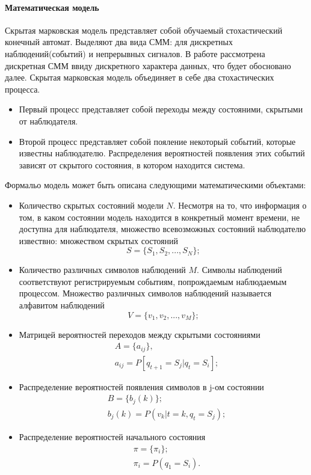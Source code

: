 \paragraph{Математическая модель}
Скрытая марковская модель представляет собой обучаемый стохастический конечный автомат. Выделяют два вида СММ: для дискретных наблюдений(событий) и непрерывных сигналов. В работе рассмотрена дискретная СММ ввиду дискретного характера данных, что будет обосновано далее. Скрытая марковская модель объединяет в себе два стохастических процесса.
\begin{itemize}
\item
Первый процесс представляет собой переходы между состояними, скрытыми от наблюдателя.
\item
Второй процесс представляет собой пояление некоторый событий, которые известны наблюдателю. Распределения вероятностей появления этих событий зависят от скрытого состояния, в котором находится система.
\end{itemize}


Формальо модель может быть описана следующими математическими объектами:
\begin{itemize}
	\item
	Количество скрытых состояний модели \(N\). Несмотря на то, что информация о том, в каком состоянии модель находится в конкретный момент времени, не доступна для наблюдателя, множество всевозможных состояний наблюдателю извествно:
	множеством скрытых состояний
	\[ S = \{ S_1, S_2, ..., S_N \};\]
	\item
	Количество различных символов наблюдений \(M\). Символы наблюдений соответствуют регистрируемым событиям, попрождаемым наблюдаемым процессом. Множество различных символов наблюдений называется алфавитом наблюдений
	\[ V = \{ v_1, v_2, ..., v_M \};\]
	\item
	Матрицей вероятностей переходов между скрытыми состояниями
	\begin{align} 
		&A = \{ a_{ij} \}, \nonumber \\
		&a_{ij} = P[q_{t + 1} = S_j | q_t = S_i]; \nonumber
	\end{align}
	\item
	Распределение вероятностей появления символов в j-ом состоянии
	\begin{align}
		&B = \{ b_j(k) \}; \nonumber \\ 
		&b_j(k) = P(v_k | t = k, q_t = S_j); \nonumber
	\end{align}
	\item
	Распределение вероятностей начального состояния
	\begin{align}
		&\pi = \{\pi_i\}; \nonumber \\
		&\pi_i = P(q_1 = S_i). \nonumber
	\end{align}
\end{itemize}

